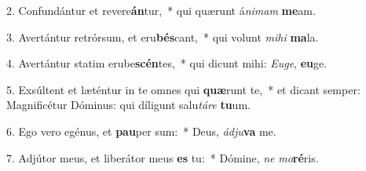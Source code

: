 ﻿2. Confundántur et revere\textbf{án}tur,~* qui quærunt á\textit{ni}\textit{mam} \textbf{me}am.

3. Avertántur retrórsum, et eru\textbf{bés}cant,~* qui volunt \textit{mi}\textit{hi} \textbf{ma}la.

4. Avertántur statim erube\textbf{scén}tes,~* qui dicunt mihi: \textit{Eu}\textit{ge}, \textbf{eu}ge.

5. Exsúltent et læténtur in te omnes qui \textbf{quæ}runt te,~* et dicant semper: Magnificétur Dóminus: qui díligunt salu\textit{tá}\textit{re} \textbf{tu}um.

6. Ego vero egénus, et \textbf{pau}per sum:~* Deus, \textit{ád}\textit{ju}\textbf{va} me.

7. Adjútor meus, et liberátor meus \textbf{es} tu:~* Dómine, \textit{ne} \textit{mo}\textbf{ré}ris.